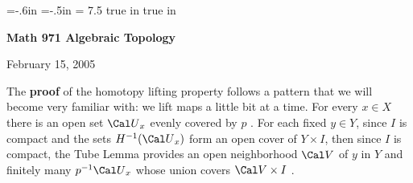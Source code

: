 
\overfullrule=0pt
\parindent=0pt

\nopagenumbers



\voffset=-.6in
\hoffset=-.5in
\hsize = 7.5 true in
 true in




\loadmsbm



\def\ctln{\centerline}
\def\u{\underbar}
\def\ssk{\smallskip}
\def\msk{\medskip}
\def\bsk{\bigskip}
\def\hsk{\hskip.1in}
\def\hhsk{\hskip.2in}
\def\dsl{\displaystyle}
\def\hskp{\hskip1.5in}

\def\lra{$\Leftrightarrow$ }
\def\ra{\rightarrow}
\def\mpto{\logmapsto}
\def\pu{\pi_1}
\def\mpu{$\pi_1$}
\def\sig{\Sigma}
\def\msig{$\Sigma$}
\def\ep{\epsilon}
\def\sset{\subseteq}
\def\del{\partial}
\def\inv{^{-1}}
\def\wtl{\widetilde}



\ctln{\bf Math 971 Algebraic Topology}

\ssk

\ctln{February 15, 2005}

\msk

The {\bf proof} of the homotopy lifting property follows a pattern 
that we will become 
very familiar with: we lift maps a little bit at a time. For every $x\in X$
there is an open set ${\Cal U}_x$ evenly covered by $p$ . For each fixed
$y\in Y$, since $I$ is compact and the sets $H^{-1}({\Cal U}_x)$ form an
open cover of $Y\times I$, then since $I$ is compact, 
the Tube Lemma provides an open neighborhood 
${\Cal V}$ of $y$ in $Y$ and finitely many $p^{-1}{\Cal U}_{x}$ whose union
covers ${\Cal V}\times I$ . 

\msk

